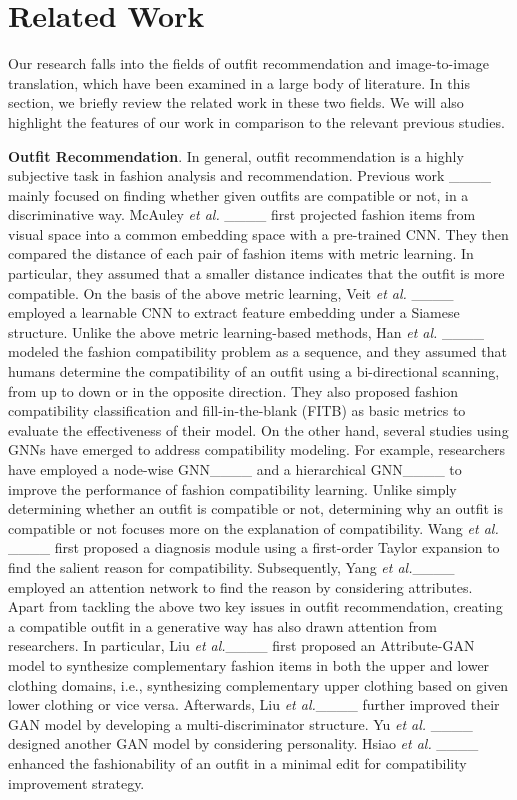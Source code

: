 \section{Related Work}
\label{related_work}
Our research falls into the fields of outfit recommendation and image-to-image translation, which have been examined in a large body of literature.
In this section, we briefly review the related work in these two fields.
We will also highlight the features of our work in comparison to the relevant previous studies.

\textbf{Outfit Recommendation}.
In general, outfit recommendation is a highly subjective task in fashion analysis and recommendation.
Previous work ____ mainly focused on finding whether given outfits are compatible or not, in a discriminative way.
McAuley \textit{et al.} ____ first projected fashion items from visual space into a common embedding space with a pre-trained CNN.
They then compared the distance of each pair of fashion items with metric learning.
In particular, they assumed that a smaller distance indicates that the outfit is more compatible.
On the basis of the above metric learning, Veit \textit{et al.} ____ employed a learnable CNN to extract feature embedding under a Siamese structure.
Unlike the above metric learning-based methods, Han \textit{et al.} ____ modeled the fashion compatibility problem as a sequence, and they assumed that humans determine the compatibility of an outfit using a bi-directional scanning, from up to down or in the opposite direction.
They also proposed fashion compatibility classification and fill-in-the-blank (FITB) as basic metrics to evaluate the effectiveness of their model.
On the other hand, several studies using GNNs have emerged to address compatibility modeling.
For example, researchers have employed a node-wise GNN____ and a hierarchical GNN____ to improve the performance of fashion compatibility learning.
Unlike simply determining whether an outfit is compatible or not, determining why an outfit is compatible or not focuses more on the explanation of compatibility.
Wang \textit{et al.} ____ first proposed a diagnosis module using a first-order Taylor expansion to find the salient reason for compatibility.
Subsequently, Yang \textit{et al.}____ employed an attention network to find the reason by considering attributes.
Apart from tackling the above two key issues in outfit recommendation, creating a compatible outfit in a generative way has also drawn attention from researchers.
In particular, Liu \textit{et al.}____ first proposed an Attribute-GAN model to synthesize complementary fashion items in both the upper and lower clothing domains, i.e., synthesizing complementary upper clothing based on given lower clothing or vice versa.
Afterwards, Liu \textit{et al.}____ further improved their GAN model by developing a multi-discriminator structure.
Yu \textit{et al.} ____ designed another GAN model by considering personality.
Hsiao \textit{et al.} ____ enhanced the fashionability of an outfit in a minimal edit for compatibility improvement strategy.

